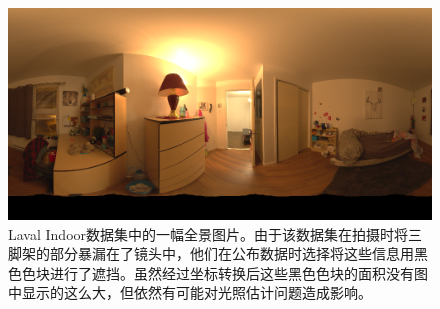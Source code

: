 \begin{figure}[!htbp]
    \centering
    \includegraphics[width=1.0\textwidth]{Img/laval-indoor.png}
    \caption[Laval Indoor数据集中的全景图片]
    {Laval Indoor\cite{gardner2017learning}数据集中的一幅全景图片。由于该数据集在拍摄时将三脚架的部分暴漏在了镜头中，他们在公布数据时选择将这些信息用黑色色块进行了遮挡。虽然经过坐标转换后这些黑色色块的面积没有图中显示的这么大，但依然有可能对光照估计问题造成影响。}
    \label{fig:laval-indoor}
\end{figure}
